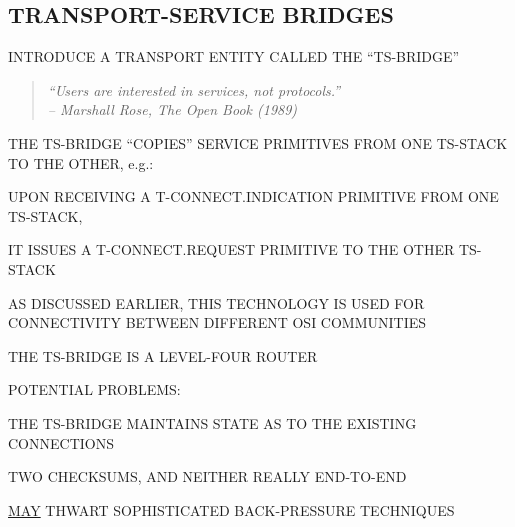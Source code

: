 \begin{bwslide}
\part*	{TRANSPORT-SERVICE BRIDGES}\bf

\begin{nrtc}
\item	INTRODUCE A TRANSPORT ENTITY CALLED THE ``TS-BRIDGE''
\begin{quote}\em
``Users are interested in services, not protocols.''\\ \raggedleft
-- Marshall Rose, The Open Book (1989)
\end{quote}

\item	THE TS-BRIDGE ``COPIES'' SERVICE PRIMITIVES FROM ONE TS-STACK TO THE
	OTHER, e.g.:
    \begin{nrtc}
    \item	UPON RECEIVING A T-CONNECT.INDICATION PRIMITIVE FROM ONE
		TS-STACK,

    \item	IT ISSUES A T-CONNECT.REQUEST PRIMITIVE TO THE OTHER TS-STACK
    \end{nrtc}

\item	AS DISCUSSED EARLIER, THIS TECHNOLOGY IS USED FOR CONNECTIVITY BETWEEN
	DIFFERENT OSI COMMUNITIES
\end{nrtc}
\end{bwslide}






\begin{bwslide}

\begin{nrtc}
\item	THE TS-BRIDGE IS A LEVEL-FOUR ROUTER

\item	POTENTIAL PROBLEMS:
    \begin{nrtc}
    \item	THE TS-BRIDGE MAINTAINS STATE AS TO THE EXISTING CONNECTIONS

    \item	TWO CHECKSUMS, AND NEITHER REALLY END-TO-END

    \item	\underline{MAY} THWART SOPHISTICATED BACK-PRESSURE TECHNIQUES
    \end{nrtc}
\end{nrtc}
\end{bwslide}


